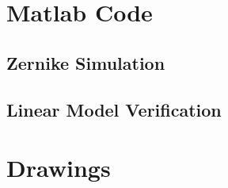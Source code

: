 \appendix    %

\chapter{Matlab Code}
\section{Zernike Simulation}
\label{app:ZernikeSimulation}
\begin{singlespace}


\end{singlespace}
\pagebreak

\section{Linear Model Verification}
\begin{singlespace}





\end{singlespace}

\chapter{Drawings}
\pagebreak

